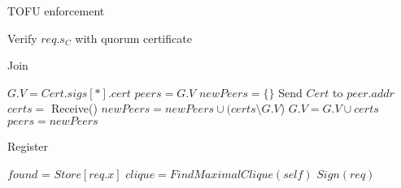 \begin{algorithm}
  \caption{TOFU enforcement}
  \SetAlgoNoLine
  Verify $req.s_C$ with quorum certificate\;
\end{algorithm}

\ifdefined\ABSTRACT
\else

\begin{algorithm}
  \caption{Join}
  \SetAlgoNoLine
  $G.V = Cert.sigs[*].cert$\;
  $peers = G.V$\;
  {
    $newPeers = \{\}$\;
    {
      Send $Cert$ to $peer.addr$\;
      $certs = $ Receive()\;
      $newPeers = newPeers \cup (certs \setminus G.V$)\;
      $G.V = G.V \cup certs$\;
    }
    $peers = newPeers$\;
  }
\end{algorithm}

\begin{algorithm}
  \caption{Register}
  \SetAlgoNoLine
  $found$ = $Store[req.x]$\;
  {
    $clique = FindMaximalClique(self)$\;
    {
      $Sign(req)$\;
    }
  }
\end{algorithm}

\fi
